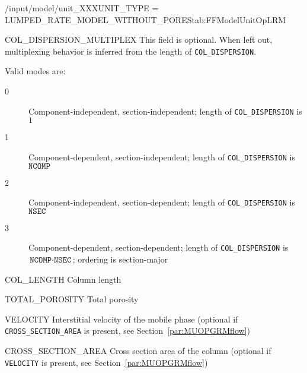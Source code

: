 \begin{condsubgroup}{/input/model/unit\_XXX}{UNIT\_TYPE = LUMPED\_RATE\_MODEL\_WITHOUT\_PORES}{tab:FFModelUnitOpLRM}
\begin{dataset}[unit=--,type=int,range={$\{0, \dots, 3 \}$},length={1}]{COL\_DISPERSION\_MULTIPLEX}
    This field is optional.
    When left out, multiplexing behavior is inferred from the length of \texttt{COL\_DISPERSION}.

    Valid modes are:
    \begin{description}
      \item[0] Component-independent, section-independent; length of \texttt{COL\_DISPERSION} is $1$
      \item[1] Component-dependent, section-independent; length of \texttt{COL\_DISPERSION} is $\texttt{NCOMP}$
      \item[2] Component-independent, section-dependent; length of \texttt{COL\_DISPERSION} is $\texttt{NSEC}$
      \item[3] Component-dependent, section-dependent; length of \texttt{COL\_DISPERSION} is $\texttt{NCOMP} \cdot \texttt{NSEC}$; ordering is section-major
    \end{description}\vspace{-\baselineskip}
  \end{dataset}
  \begin{dataset}[unit=\si{\metre},type=double,range={$> 0$},length={1}]{COL\_LENGTH}
    Column length
  \end{dataset}
  \begin{dataset}[unit=--,type=double,range={$[0,1]$},length={1}]{TOTAL\_POROSITY}
    Total porosity
  \end{dataset}
  \begin{dataset}[unit=\si{\metre\per\second},type=double,range={$\mathds{R}$},length={1 / \texttt{NSEC}}]{VELOCITY}
    Interstitial velocity of the mobile phase (optional if \texttt{CROSS\_SECTION\_AREA} is present, see Section~\ref{par:MUOPGRMflow})
  \end{dataset}
  \begin{dataset}[unit=\si{\square\metre},type=double,range={$>0$},length={1}]{CROSS\_SECTION\_AREA}
    Cross section area of the column (optional if \texttt{VELOCITY} is present, see Section~\ref{par:MUOPGRMflow})
  \end{dataset}
\end{condsubgroup}

